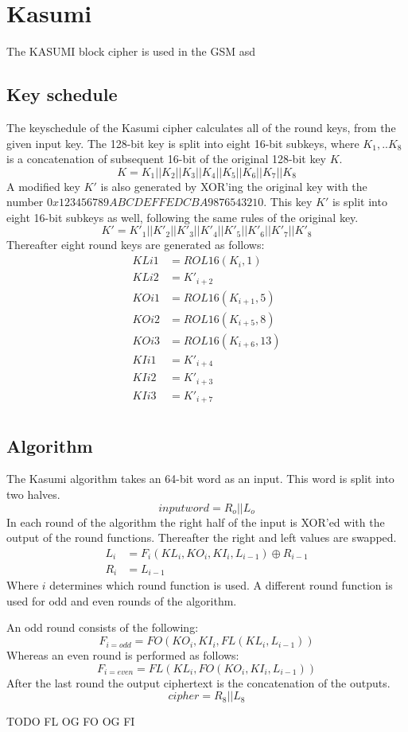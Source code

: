 \chapter{Kasumi}
The KASUMI block cipher is used in the GSM asd
\section{Key schedule}
The keyschedule of the Kasumi cipher calculates all of the round keys,
from the given input key. The 128-bit key is split into eight 16-bit
subkeys, where $K_1,..K_8$ is a concatenation of subsequent 16-bit of
the original 128-bit key $K$.
\[K = K_1 || K_2 || K_3 || K_4 || K_5 || K_6 || K_7 || K_8\]
A modified key $K'$ is also generated by XOR'ing the original key with
the number $0x123456789ABCDEFFEDCBA9876543210$. This key $K'$ is split
into eight 16-bit subkeys as well, following the same rules of the
original key.
\[K' = K'_1 || K'_2 || K'_3 || K'_4 || K'_5 || K'_6 || K'_7 || K'_8\]
Thereafter eight round keys are generated as follows:
\begin{align*}
  KLi1 &= ROL16(K_i,1)\\
  KLi2 &= K'_{i+2}\\
  KOi1 &= ROL16(K_{i + 1},5)\\
  KOi2 &= ROL16(K_{i + 5},8)\\
  KOi3 &= ROL16(K_{i + 6},13)\\
  KIi1 &= K'_{i+4}\\
  KIi2 &= K'_{i+3}\\
  KIi3 &= K'_{i+7}\\
\end{align*}

\section{Algorithm}
The Kasumi algorithm takes an 64-bit word as an input. This word is
split into two halves.
\[ inputword = R_o || L_o\]
In each round of the algorithm the right half of the input is XOR'ed
with the output of the round functions. Thereafter the right and left
values are swapped. 
\begin{align*}
  L_i &= F_i(KL_i,KO_i,KI_i,L_{i - 1}) \oplus R_{i - 1} \\
  R_i &= L_{i - 1}
\end{align*}
Where $i$ determines which round function is used. A different round
function is used for odd and even rounds of the algorithm.

An odd round consists of the following:
\[F_{i = odd} = FO(KO_i, KI_i, FL(KL_i, L_{i - 1})) \]
Whereas an even round is performed as follows:
\[F_{i = even} = FL(KL_i, FO(KO_i,KI_i, L_{i - 1})) \]
After the last round the output ciphertext is the concatenation of the
outputs.
\[cipher = R_8 || L_8\]

TODO
FL OG FO OG FI

